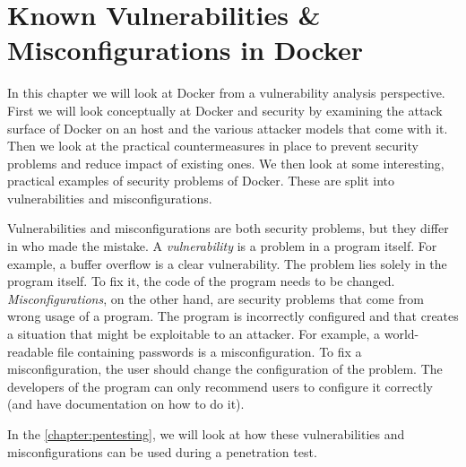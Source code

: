 \chapter{Known Vulnerabilities \& Misconfigurations in Docker}\label{chapter:vulnerabilities-misconfigurations}
In this chapter we will look at Docker from a vulnerability analysis perspective. First we will look conceptually at Docker and security by examining the attack surface of Docker on an host and the various attacker models that come with it. Then we look at the practical countermeasures in place to prevent security problems and reduce impact of existing ones. We then look at some interesting, practical examples of security problems of Docker. These are split into vulnerabilities and misconfigurations.

\hfill

Vulnerabilities and misconfigurations are both security problems, but they differ in who made the mistake. A \emph{vulnerability} is a problem in a program itself. For example, a buffer overflow is a clear vulnerability. The problem lies solely in the program itself. To fix it, the code of the program needs to be changed. \emph{Misconfigurations}, on the other hand, are security problems that come from wrong usage of a program. The program is incorrectly configured and that creates a situation that might be exploitable to an attacker. For example, a world-readable file containing passwords is a misconfiguration. To fix a misconfiguration, the user should change the configuration of the problem. The developers of the program can only recommend users to configure it correctly (and have documentation on how to do it).

\hfill

In the \autoref{chapter:pentesting}, we will look at how these vulnerabilities and misconfigurations can be used during a penetration test.





